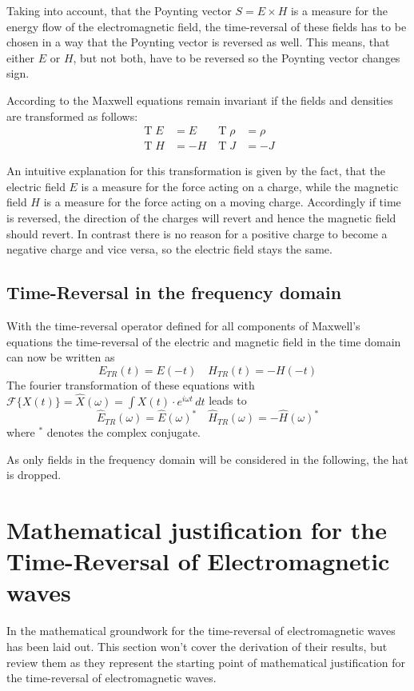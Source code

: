 Taking into account, that the Poynting vector \(S = E \times H\) is a measure for the energy flow of the electromagnetic field, the time-reversal of these fields has to be chosen in a way that the Poynting vector is reversed as well.
This means, that either \(E\) or \(H\), but not both, have to be reversed so the Poynting vector changes sign. 

According to \parencite{sigwarth_time_2022} the Maxwell equations remain invariant if the fields and densities are transformed as follows:
\begin{align}
    \operatorname{T}E &= E & \operatorname{T}\rho &= \rho \\
    \operatorname{T}H &= -H & \operatorname{T}{J} &= -{J}
\end{align}

An intuitive explanation for this transformation is given by the fact, that the electric field \(E\) is a measure for the force acting on a charge, while the magnetic field \(H\) is a measure for the force acting on a moving charge. 
Accordingly if time is reversed, the direction of the charges will revert and hence the magnetic field should revert. 
In contrast there is no reason for a positive charge to become a negative charge and vice versa, so the electric field stays the same.



\subsection{Time-Reversal in the frequency domain}
With the time-reversal operator defined for all components of Maxwell's equations the time-reversal of the electric and magnetic field in the time domain can now be written as
\begin{equation}
    E_{TR}(t) = E(-t) \quad H_{TR}(t) = -H(-t)
\end{equation}
The fourier transformation of these equations with \(\mathcal{F}\{X(t)\} = \hat{X}(\omega) = \int X(t) \cdot e^{i\omega t} \, dt\) leads to
\begin{equation}
    \hat{E}_{TR}(\omega) = \hat{E}{(\omega)}^* \quad \hat{H}_{TR}(\omega) = -\hat{H}{(\omega)}^*
\end{equation}
where \(^*\) denotes the complex conjugate. 

As only fields in the frequency domain will be considered in the following, the hat is dropped.



\section{Mathematical justification for the Time-Reversal of Electromagnetic waves}\label{sec:math_foundations_em_tr}
In \parencite{de_rosny_theory_2010} the mathematical groundwork for the time-reversal of electromagnetic waves has been laid out.
This section won't cover the derivation of their results, but review them as they represent the starting point of mathematical justification for the time-reversal of electromagnetic waves.

